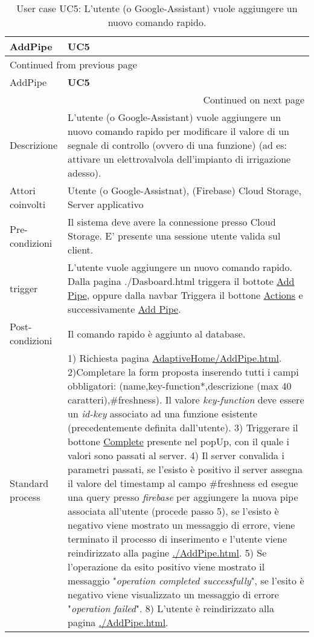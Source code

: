 \documentclass[onecolumn,a4paper]{article}
\begin{document}
\begin{longtable}{|l|p{9.7cm}|}
\caption{User case UC5: L'utente (o Google-Assistant) vuole aggiungere un nuovo comando rapido.}
\\
\cellcolor{grey!15}AddPipe & \cellcolor{grey!15} \textbf{UC5}\\
\hline
\endfirsthead
\multicolumn{2}{l}{Continued from previous page} \\
\hline

\cellcolor{grey!15}AddPipe & \cellcolor{grey!15} \textbf{UC5} \\

\hline
\endhead
\hline\multicolumn{2}{r}{Continued on next page} \\
\endfoot
\endlastfoot
\hline
Descrizione & L'utente (o Google-Assistant) vuole aggiungere un nuovo comando rapido  per modificare il valore di un segnale di controllo (ovvero di una funzione) (ad es: attivare un elettrovalvola dell'impianto di irrigazione adesso).\\
\hline
Attori coinvolti & Utente (o Google-Assistnat), (Firebase) Cloud Storage, Server applicativo\\
\hline
Pre-condizioni & Il sistema deve avere la connessione presso Cloud Storage. E' presente una sessione utente valida sul client.\\
\hline
trigger & L'utente vuole aggiungere un nuovo comando rapido. Dalla pagina ./Dasboard.html triggera il bottote \uline{Add Pipe}, oppure dalla navbar Triggera il bottone \uline{Actions} e successivamente \uline{Add Pipe}.\\
\hline
Post-condizioni & Il comando rapido è aggiunto al database.\\
\hline
Standard process & 1) Richiesta pagina \uline{AdaptiveHome/AddPipe.html}. 2)Completare la form proposta inserendo tutti i campi obbligatori: (name,key-function*,descrizione (max 40 caratteri),\#freshness). Il valore \emph{key-function} deve essere un \emph{id-key} associato ad una funzione esistente (precedentemente definita dall'utente). 3) Triggerare il bottone \uline{Complete} presente nel popUp, con il quale i valori sono passati al server. 4) Il server convalida i parametri passati, se l'esisto è positivo il server assegna il valore del timestamp al campo \#freshness ed esegue una query presso \emph{firebase} per aggiungere la nuova pipe associata all'utente (procede passo 5), se l'esisto è negativo viene mostrato un messaggio di errore, viene terminato il processo di inserimento e l'utente viene reindirizzato alla pagine \uline{./AddPipe.html}. 5) Se l'operazione da esito positivo viene mostrato il messaggio "\emph{operation completed successfully}", se l'esito è negativo viene visualizzato un messaggio di errore "\emph{operation failed}". 8) L'utente è reindirizzato alla pagina \uline{./AddPipe.html}.\\

\end{longtable}
\end{document}
